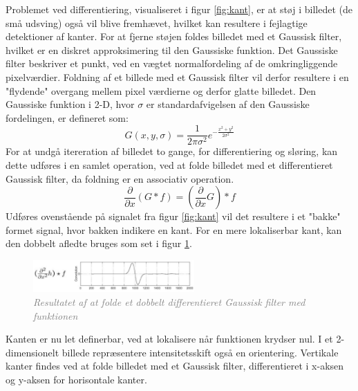 Problemet ved differentiering, visualiseret i figur \ref{fig:kant}, er at støj i billedet (de små udsving) også vil blive fremhævet, hvilket kan resultere i fejlagtige detektioner af kanter. For at fjerne støjen foldes billedet med et Gaussisk filter, hvilket er en diskret approksimering til den Gaussiske funktion. Det Gaussiske filter beskriver et punkt, ved en vægtet normalfordeling af de omkringliggende pixelværdier. Foldning af et billede med et Gaussisk filter vil derfor resultere i en "flydende" overgang mellem pixel værdierne og derfor glatte billedet.  Den Gaussiske funktion i 2-D, hvor $ \sigma $ er standardafvigelsen af den Gaussiske fordelingen, er defineret som:
\begin{equation}
G(x,y,\sigma) = \frac{1}{2 \pi \sigma ^{2}} e^{- \frac{x^{2} + y^{2}}{2 \sigma ^{2}}}
\label{2dgaussian}
\end{equation} 
For at undgå itereration af billedet to gange, for differentiering og sløring, kan dette udføres i en samlet operation, ved at folde billedet med et differentieret Gaussisk filter, da foldning er en associativ operation.
\begin{equation}
\dfrac{\partial}{\partial x}(G \ast f) = (\dfrac{\partial}{\partial x}G) \ast f
\end{equation}
Udføres ovenstående på signalet fra figur \ref{fig:kant} vil det resultere i et "bakke" formet signal, hvor bakken indikere en kant. For en mere lokaliserbar kant, kan den dobbelt afledte bruges som set i figur \ref{fig:deriv}.
\begin{figure}[H]
    \centering
    \includegraphics[width=0.55\textwidth]{fig/8.png}
    \vspace{-1em}   
    \begin{center}
    \caption{\textcolor{gray}{\footnotesize \textit{
     Resultatet af at folde et dobbelt differentieret Gaussisk filter med funktionen}}}
    \label{fig:deriv}
     \end{center}
    \vspace{-2.5em}  
  \end{figure}
\noindent
Kanten er nu let definerbar, ved at lokalisere når funktionen krydser nul. I et 2-dimensionelt billede repræsentere intensitetsskift også en orientering. Vertikale kanter findes ved at folde billedet med et Gaussisk filter, differentieret i x-aksen og y-aksen for horisontale kanter.
